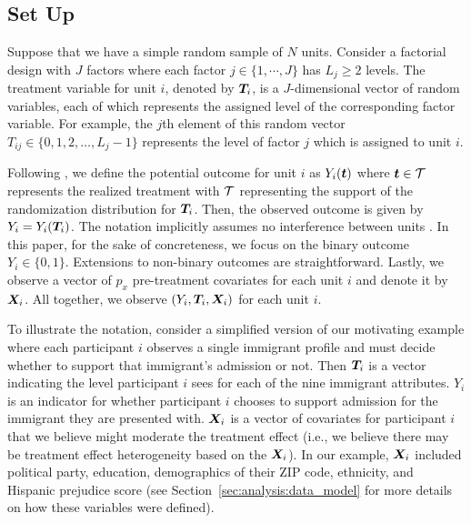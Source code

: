 \subsection{Set Up}

Suppose that we have a simple random sample of $N$ units.  Consider a
factorial design with $J$ factors where each factor
$j \in \{1, \cdots, J\}$ has $L_j \ge 2$ levels.  The treatment
variable for unit $i$, denoted by $\bm{T}_i$, is a $J$-dimensional vector
of random variables, each of which represents the assigned level of
the corresponding factor variable.  For example, the $j$th element of
this random vector $T_{ij} \in \{0,1,2,\ldots,L_j-1\}$ represents the
level of factor $j$ which is assigned to unit $i$.

Following \cite{DasPilRub15}, we define the potential outcome for unit $i$ as
$Y_i(\bm{t})$ where $\bm{t} \in \mathcal{T}$ represents the realized treatment with
$\mathcal{T}$ representing the support of the randomization distribution for
$\bm{T}_i$.  Then, the observed outcome is given by $Y_i = Y_i(\bm{T}_i)$.
The notation implicitly assumes no interference between units
\citep{Rubin80}.  In this paper, for the sake of concreteness, we
focus on the binary outcome $Y_i \in \{0, 1\}$.  Extensions to
non-binary outcomes are straightforward.  Lastly, we observe a vector
of $p_x$ pre-treatment covariates for each unit $i$ and denote it by
$\bm{X}_i$.
All together, we observe $(Y_i, \bm{T}_i, \bm{X}_i)$ for each unit $i$.

To illustrate the notation, consider a simplified version of our motivating example where each participant $i$ observes a single immigrant profile and must decide whether to support that immigrant's admission or not.
Then $\bm{T}_i$ is a vector indicating the level participant $i$ sees for each of the nine immigrant attributes.
$Y_i$ is an indicator for whether participant $i$ chooses to support admission for the immigrant they are presented with.
$\bm{X}_i$ is a vector of covariates for participant $i$ that we believe might moderate the treatment effect (i.e., we believe there may be treatment effect heterogeneity based on the $\bm{X}_i$).
In our example, $\bm{X}_i$ included political party, education, demographics of their ZIP code, ethnicity, and Hispanic prejudice score (see Section~\ref{sec:analysis:data_model} for more details on how these variables were defined).

